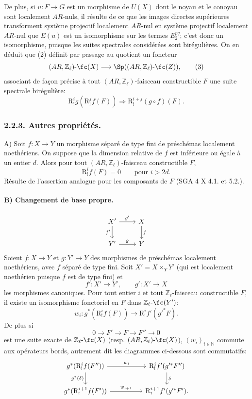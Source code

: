 De plus, si \(u:F\to G\) est un morphisme de \(U(X)\) dont le noyau et le conoyau sont localement \(AR\)-nuls, il résulte de ce que les images directes supérieures transforment système projectif localement \(AR\)-nul en système projectif localement \(AR\)-nul que \(E(u)\) est un isomorphisme sur les termes \(E_2^{pq}\); c'est donc un isomorphisme, puisque les suites spectrales considérées sont birégulières. On en déduit que (2) définit par passage au quotient un foncteur
\[
(AR,\mathbb{Z}_\ell)\text{-}\fc(X)
\longrightarrow \Sp((AR,\mathbb{Z}_\ell)\text{-}\fc(Z)),
\tag{3}
\]
associant de façon précise à tout \((AR,\mathbb{Z}_\ell)\)-faisceau constructible \(F\) une suite spectrale birégulière:
\[
\mathrm{R}^i_!g(\mathrm{R}^j_!f(F))\Longrightarrow \mathrm{R}^{i+j}_!(g\circ f)(F).
\]

\subsubsection*{2.2.3. Autres propriétés.}

A) Soit \(f:X\to Y\) un morphisme séparé de type fini de préschémas localement noethériens. On suppose que la dimension relative de \(f\) est inférieure ou égale à un entier \(d\). Alors pour tout \((AR,\mathbb{Z}_\ell)\)-faisceau constructible \(F\),
\[
\mathrm{R}^i_!f(F)=0\qquad\text{pour }i>2d.
\]
Résulte de l'assertion analogue pour les composants de \(F\) (SGA 4 X 4.1. et 5.2.).

\paragraph{B) Changement de base propre.}
\[
\begin{tikzcd}
X' \arrow[r,"g'"] \arrow[d,"f'"'] & X \arrow[d,"f"]\\
Y' \arrow[r,"g"] & Y
\end{tikzcd}
\]
Soient \(f:X\to Y\) et \(g:Y'\to Y\) des morphismes de préschémas localement noethériens, avec \(f\) séparé de type fini. Soit \(X'=X\times_Y Y'\) (qui est localement noethérien puisque \(f\) est de type fini) et
\[
f':X'\to Y',\qquad g':X'\to X
\]
les morphismes canoniques. Pour tout entier \(i\) et tout \(\mathbb{Z}_\ell\)-faisceau constructible \(F\), il existe un isomorphisme fonctoriel en \(F\) dans \(\mathbb{Z}_\ell\text{-}\fc(Y')\):
\[
w_i:g^*(\mathrm{R}^i_!f(F))\longrightarrow \mathrm{R}^i_!f'(g'^*F).
\]
De
plus si
\[
0\longrightarrow F'\longrightarrow F\longrightarrow F''\longrightarrow 0
\]
est une suite exacte de \(\mathbb{Z}_\ell\text{-}\fc(X)\) (resp. \((AR,\mathbb{Z}_\ell)\text{-}\fc(X)\)), \((w_i)_{i\in\mathbb{N}}\) commute aux opérateurs bords, autrement dit les diagrammes ci-dessous sont commutatifs:
\[
\begin{tikzcd}[column sep=huge]
g^*(\mathrm{R}^i_!f(F'')) \arrow[r,"w_i"] \arrow[d,"g^*(\delta)"']
&
\mathrm{R}^i_!f'(g'^*F'') \arrow[d,"\delta"]\\
g^*(\mathrm{R}^{i+1}_!f(F')) \arrow[r,"w_{i+1}"]
&
\mathrm{R}^{i+1}_!f'(g'^*F').
\end{tikzcd}
\]

